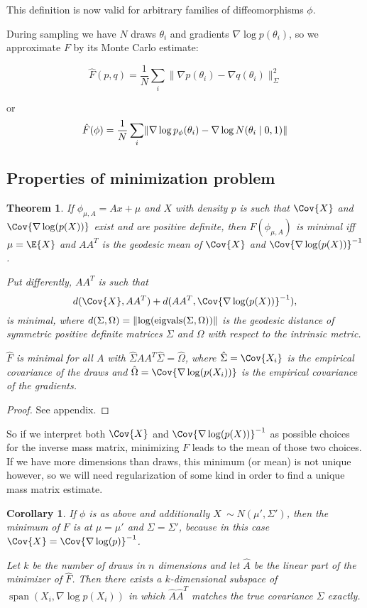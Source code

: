 \documentclass{scrartcl}
\DeclareMathOperator{\eigvals}{eigvals}
\DeclareMathOperator{\vecSpan}{span}
\DeclarePairedDelimiter{\norm}{\lVert}{\rVert}
\newtheorem{thm}{Theorem}
\newtheorem{cor}{Corollary}
\begin{document}
This definition is now valid for arbitrary families of diffeomorphisms $\phi$.

During sampling we have $N$ draws $\theta_i$ and gradients $\nabla \log
p(\theta_i)$, so we approximate $F$ by its Monte Carlo estimate:

\[
\hat{F}(p, q)
  = \frac{1}{N} \sum_i \lVert \nabla p(\theta_i)
    - \nabla q(\theta_i)\rVert^2_\Sigma
\]

or
\[
\hat{F}(\phi)
  = \frac{1}{N} \sum_i
    \norm{\nabla \log p_\phi(\theta_i) - \nabla \log N(\theta_i \mid 0, 1)}
\]

\subsection{Properties of minimization problem}

\begin{thm}
If $\phi_{\mu, A} = Ax + \mu$ and $X$ with density $p$ is such that $\Cov{X}$
and $\Cov{\nabla \log(p(X))}$ exist and are positive definite, then
$F(\phi_{\mu, A})$ is minimal iff $\mu = \E{X}$ and $AA^T$ is the
geodesic mean of $\Cov{X}$ and $\Cov{\nabla \log(p(X))}^{-1}$.

Put differently, $AA^T$ is such that
\[
d(\Cov{X}, AA^T) + d(AA^T, \Cov{\nabla\log(p(X))}^{-1}),
\]
is minimal, where $d(\Sigma, \Omega) = \norm{\log(\eigvals(\Sigma, \Omega))}$
is the geodesic distance of symmetric positive definite matrices
$\Sigma$ and $\Omega$ with respect to the intrinsic metric.

$\hat{F}$ is minimal for all $A$ with $\hat{\Sigma} AA^T\hat{\Sigma} =
\hat{\Omega}$, where $\hat{\Sigma} = \Cov{X_i}$ is the empirical
covariance of the draws and $\hat{\Omega} = \Cov{\nabla \log(p(X_i))}$ is
the empirical covariance of the gradients.
\end{thm}

\begin{proof}
See appendix.
\end{proof}

So if we interpret both $\Cov{X}$ and $\Cov{\nabla \log(p(X))}^{-1}$ as
possible choices for the inverse mass matrix, minimizing $F$ leads to the mean
of those two choices. If we have more dimensions than draws, this minimum (or
mean) is not unique however, so we will need regularization of some kind in
order to find a unique mass matrix estimate.

\begin{cor}
If $\phi$ is as above and additionally $X ~ \sim N(\mu', \Sigma')$,
then the minimum of $F$ is at $\mu = \mu'$ and $\Sigma = \Sigma'$, because in
this case $\Cov{X} = \Cov{\nabla \log(p)}^{-1}$.

Let $k$ be the number of draws in $n$ dimensions and let $\hat A$ be the linear
part of the minimizer of $\hat F$. Then there exists a $k$-dimensional
subspace of $\vecSpan(X_i, \nabla\log p(X_i))$ in which $\hat A\hat A^T$
matches the true covariance $\Sigma$ exactly.
\end{cor}
\end{document}
